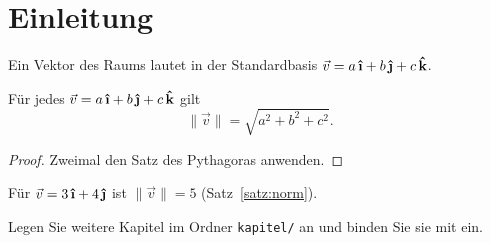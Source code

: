 \chapter{Einleitung}
\label{kap:einleitung}

\begin{definition}
  Ein Vektor des Raums lautet in der Standardbasis
  $\vec{v} = a\,\ihat + b\,\jhat + c\,\khat$.
\end{definition}

\begin{satz}
  \label{satz:norm}
  Für jedes $\vec{v} = a\,\ihat + b\,\jhat + c\,\khat$ gilt
  \[
    \lVert \vec{v} \rVert = \sqrt{a^2 + b^2 + c^2}.
  \]
\end{satz}

\begin{proof}
  Zweimal den Satz des Pythagoras anwenden.
\end{proof}

\begin{beispiel}
  Für $\vec{v} = 3\,\ihat + 4\,\jhat$ ist $\lVert \vec{v} \rVert = 5$
  (Satz~\ref{satz:norm}).
\end{beispiel}

\begin{bemerkung}
  Legen Sie weitere Kapitel im Ordner \texttt{kapitel/} an und binden Sie sie mit \verb|| ein.
\end{bemerkung}
